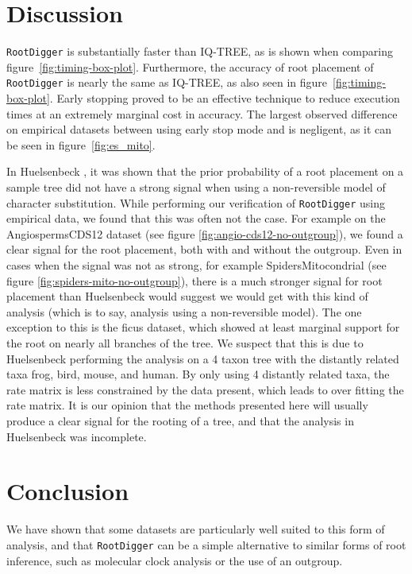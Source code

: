 \documentclass{article}
\newcommand{\RootDiggertt}{\texttt{RootDigger}}
\begin{document}
\section{Discussion}


\RootDiggertt{} is substantially faster than IQ-TREE, as is shown when comparing
figure~\ref{fig:timing-box-plot}. Furthermore, the accuracy of root placement of
\RootDiggertt{} is nearly the same as IQ-TREE, as also seen in
figure~\ref{fig:timing-box-plot}.  Early stopping proved to be an effective
technique to reduce execution times at an extremely marginal cost in accuracy.
The largest observed difference on empirical datasets between using early stop
mode and is negligent, as it can be seen in figure~\ref{fig:es_mito}. 

In Huelsenbeck \cite{huelsenbeck_inferring_2002}, it was shown that the prior
probability of a root placement on a sample tree did not have a strong signal
when using a non-reversible model of character substitution.  While performing
our verification of \RootDiggertt{} using empirical data, we found that this was
often not the case. For example on the AngiospermsCDS12 dataset (see figure
\ref{fig:angio-cds12-no-outgroup}), we found a clear signal for the root
placement, both with and without the outgroup. Even in cases when the signal was
not as strong, for example SpidersMitocondrial (see figure
\ref{fig:spiders-mito-no-outgroup}), there is a much stronger signal for root
placement than Huelsenbeck would suggest we would get with this kind of analysis
(which is to say, analysis using a non-reversible model). The one exception to
this is the ficus dataset, which showed at least marginal support for the root
on nearly all branches of the tree. We suspect that this is due to Huelsenbeck
performing the analysis on a 4 taxon tree with the distantly related taxa frog,
bird, mouse, and human. By only using 4 distantly related taxa, the rate matrix
is less constrained by the data present, which leads to over fitting the rate
matrix.  It is our opinion that the methods presented here will usually produce
a clear signal for the rooting of a tree, and that the analysis in Huelsenbeck
was incomplete.

\section{Conclusion}

We have shown that some datasets are particularly well suited to this form of
analysis, and that \RootDiggertt{} can be a simple alternative to similar forms
of root inference, such as molecular clock analysis or the use of an outgroup.
\end{document}
